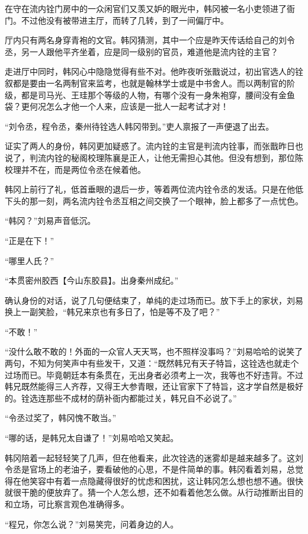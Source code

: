 在守在流内铨门房中的一众闲官们又羡又妒的眼光中，韩冈被一名小吏领进了衙门。不过他没有被带进主厅，而转了几转，到了一间偏厅中。

厅内只有两名身穿青袍的文官。韩冈猜测，其中一个应是昨天传话给自己的刘令丞，另一人跟他平齐坐着，应是同一级别的官员，难道他是流内铨的主官？

走进厅中同时，韩冈心中隐隐觉得有些不对。他昨夜听张戬说过，初出官选人的铨叙都是要由一名两制官来监考，也就是翰林学士或是中书舍人。而以两制官的阶级，都是司马光、王珪那个等级的人物，有哪个没有一身朱袍穿，腰间没有金鱼袋？更何况怎么才他一个人来，应该是一批人一起考试才对！

“刘令丞，程令丞，秦州待铨选人韩冈带到。”吏人禀报了一声便退了出去。

证实了两人的身份，韩冈更加疑惑了。流内铨的主官是判流内铨事，而张戬昨日也说了，判流内铨的秘阁校理陈襄是正人，让他无需担心其他。但没有想到，那位陈校理并不在，而是两位令丞在候着他。

韩冈上前行了礼，低首垂眼的退后一步，等着两位流内铨令丞的发话。只是在他低下头的那一刻，两名流内铨令丞互相之间交换了一个眼神，脸上都多了一点忧色。

“韩冈？”刘易声音低沉。

“正是在下！”

“哪里人氏？”

“本贯密州胶西【今山东胶县】。出身秦州成纪。”

确认身份的对话，说了几句便结束了，单纯的走过场而已。放下手上的家状，刘易换上一副笑脸，“韩兄来京也有多日了，怕是等不及了吧？”

“不敢！”

“没什么敢不敢的！外面的一众官人天天骂，也不照样没事吗？”刘易哈哈的说笑了两句，不知为何笑声中有些发干，又道：“既然韩兄有天子特旨，这铨选也就走个过场而已。毕竟朝廷本有条贯在，无出身者必须考上一次，我等也不好违背。不过韩兄既然能得三人齐荐，又得王大参青眼，还让官家下了特旨，这才学自然是极好的。铨选连那些不成材的荫补衙内都能过关，韩兄自不必说了。”

“令丞过奖了，韩冈愧不敢当。”

“哪的话，是韩兄太自谦了！”刘易哈哈又笑起。

韩冈陪着一起轻轻笑了几声，但在他看来，此次铨选的迷雾却是越来越多了。这刘令丞是官场上的老油子，要看破他的心思，不是件简单的事。韩冈看着刘易，总觉得在他笑容中有着一点隐藏得很好的忧虑和困扰，这让韩冈怎么想也想不通。很快就很干脆的便放弃了。猜一个人怎么想，还不如看着他怎么做。从行动推断出目的和立场，可比察言观色准确得多。

“程兄，你怎么说？”刘易笑完，问着身边的人。

